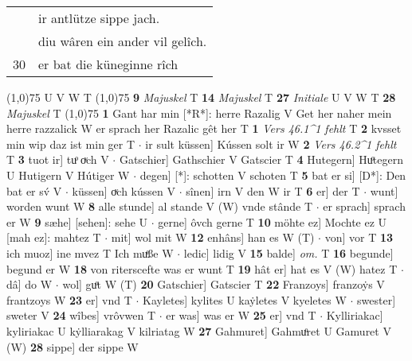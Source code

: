 \documentclass[8pt,a4paper,notitlepage]{article}
\begin{document}
\begin{table}[ht]
\begin{minipage}[t]{0.5\linewidth}
\begin{tabular}{rl}
 & ir antlütze sippe jach.\\ 
 & diu wâren ein ander vil gelîch.\\ 
30 & er bat die küneginne rîch\\ 
\end{tabular}
\scriptsize
\line(1,0){75} \newline
U V W T \newline
\line(1,0){75} \newline
\textbf{9} \textit{Majuskel} T  \textbf{14} \textit{Majuskel} T  \textbf{27} \textit{Initiale} U V W T  \textbf{28} \textit{Majuskel} T  \newline
\line(1,0){75} \newline
\textbf{1} Gant har min [*R*]: herre Razalig V Get her naher mein herre razzalick W er sprach her Razalic gêt her T \textbf{1} \textit{Vers 46.1\textasciicircum1 fehlt} T  \textbf{2} kvsset min wip daz ist min ger T  $\cdot$ ir sult küssen] Kússen solt ir W \textbf{2} \textit{Vers 46.2\textasciicircum1 fehlt} T  \textbf{3} tuot ir] tuͦ oͮch V  $\cdot$ Gatschier] Gathschier V Gatscier T \textbf{4} Hutegern] Huͦtegern U Hutigern V Hútiger W  $\cdot$ degen] [*]: schotten V schoten T \textbf{5} bat er si] [D*]: Den bat er sv́ V  $\cdot$ küssen] oͮch kússen V  $\cdot$ sînen] irn V den W ir T \textbf{6} er] der T  $\cdot$ wunt] worden wunt W \textbf{8} alle stunde] al stande V (W) vnde stânde T  $\cdot$ er sprach] sprach er W \textbf{9} sæhe] [sehen]: sehe U  $\cdot$ gerne] ôvch gerne T \textbf{10} möhte ez] Mochte ez U [mah ez]: mahtez T  $\cdot$ mit] wol mit W \textbf{12} enhâns] han es W (T)  $\cdot$ von] vor T \textbf{13} ich muoz] ine mvez T Ich muͤße W  $\cdot$ ledic] lidig V \textbf{15} balde] \textit{om.} T \textbf{16} begunde] begund er W \textbf{18} von riterscefte was er wunt T \textbf{19} hât er] hat es V (W) hatez T  $\cdot$ dâ] do W  $\cdot$ wol] guͦt W (T) \textbf{20} Gatschier] Gatscier T \textbf{22} Franzoys] franzoẏs V frantzoys W \textbf{23} er] vnd T  $\cdot$ Kayletes] kylites U kaẏletes V kyeletes W  $\cdot$ swester] sweter V \textbf{24} wîbes] vrôvwen T  $\cdot$ er was] was er W \textbf{25} er] vnd T  $\cdot$ Kylliriakac] kyliriakac U kẏlliarakag V kilriatag W \textbf{27} Gahmuret] Gahmuͦret U Gamuret V (W) \textbf{28} sippe] der sippe W \newline
\end{minipage}
\end{table}
\end{document}
